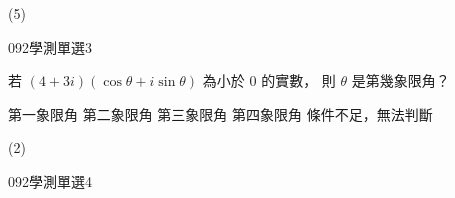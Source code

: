 \begin{QUESTIONS}
\begin{QUESTION}
        \begin{QTAGS}\end{QTAGS}
        \begin{QANS}
            (5)
        \end{QANS}
        \begin{QSOLLIST}
        \end{QSOLLIST}
        \begin{QEMPTYSPACE}
        \end{QEMPTYSPACE}
    \end{QUESTION}
    \begin{QUESTION}
        \begin{ExamInfo}{092}{學測}{單選}{3}
        \end{ExamInfo}
        \begin{ExamAnsRateInfo}{41}{66}{36}{21}
        \end{ExamAnsRateInfo}
        \begin{QBODY}
            若 $(4 + 3i)(\cos \theta + i \sin \theta )$ 為小於 0 的實數， 則 $\theta$ 是第幾象限角？ 
            \begin{QOPS} 
                \QOP 第一象限角 
                \QOP 第二象限角 
                \QOP 第三象限角 
                \QOP 第四象限角 
                \QOP 條件不足，無法判斷
            \end{QOPS}
        \end{QBODY}
        \begin{QFROMS}
        \end{QFROMS}
        \begin{QTAGS}\end{QTAGS}
        \begin{QANS}
            (2)
        \end{QANS}
        \begin{QSOLLIST}
        \end{QSOLLIST}
        \begin{QEMPTYSPACE}
        \end{QEMPTYSPACE}
    \end{QUESTION}
    \begin{QUESTION}
        \begin{ExamInfo}{092}{學測}{單選}{4}
        \end{ExamInfo}
        \begin{ExamAnsRateInfo}{49}{69}{47}{31}
        \end{ExamAnsRateInfo}
        \begin{QBODY}

\end{QBODY}
\end{QUESTION}
\end{QUESTIONS}
